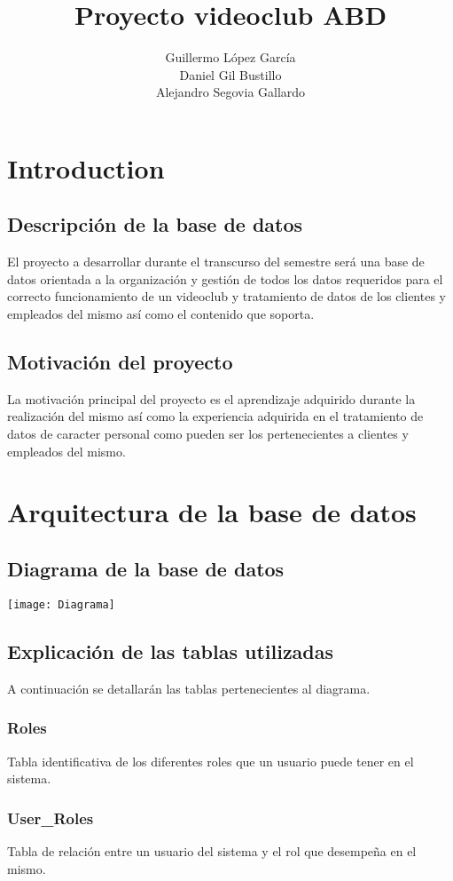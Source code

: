 \documentclass{article}
\title{Proyecto videoclub ABD}
\author{
Guillermo López García\\
Daniel Gil Bustillo \\
Alejandro Segovia Gallardo
}
\begin{document}
\maketitle

\section{Introduction}

\subsection{Descripción de la base de datos}
El proyecto a desarrollar durante el transcurso del semestre será una base de datos orientada a la organización y gestión de todos los datos requeridos para el correcto funcionamiento de un videoclub y tratamiento de datos de los clientes y empleados del mismo así como el contenido que soporta.

\subsection{Motivación del proyecto}
La motivación principal del proyecto es el aprendizaje adquirido durante la realización del mismo así como la experiencia adquirida en el tratamiento de datos de caracter personal como pueden ser los pertenecientes a clientes y empleados del mismo.

\section{Arquitectura de la base de datos}

\subsection{Diagrama de la base de datos}
\texttt{[image: Diagrama]}

\subsection{Explicación de las tablas utilizadas}
A continuación se detallarán las tablas pertenecientes al diagrama.
\subsubsection{Roles}
Tabla identificativa de los diferentes roles que un usuario puede tener en el sistema.
\subsubsection{User\_Roles}
Tabla de relación entre un usuario del sistema y el rol que desempeña en el mismo.
\end{document}
